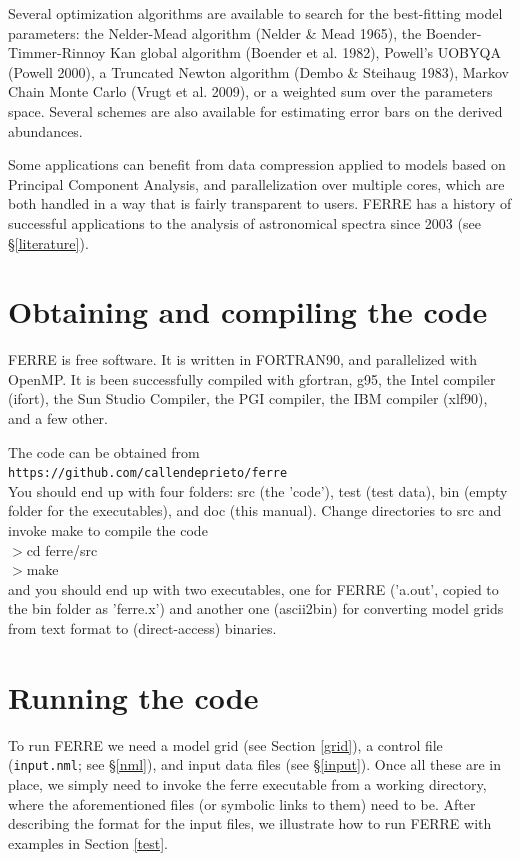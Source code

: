 \documentclass[12pt]{article}
\begin{document}
Several optimization algorithms are available to search for the 
best-fitting model parameters: 
the Nelder-Mead algorithm (Nelder \& Mead 1965), 
the  Boender-Timmer-Rinnoy Kan global algorithm (Boender et al. 1982), 
Powell's UOBYQA (Powell 2000), 
a Truncated Newton algorithm (Dembo \& Steihaug 1983), Markov Chain Monte Carlo (Vrugt et al. 2009),  
or a weighted sum over the parameters space. Several schemes are also available 
for estimating error bars on the derived abundances. 

Some applications can benefit from data compression applied to models based on 
Principal Component Analysis, and parallelization
over multiple cores, which are both handled in a way that is
fairly transparent to users.
FERRE has a history of successful applications to the analysis of
astronomical spectra since 2003 (see \S \ref{literature}).

\section{Obtaining and compiling the code}
\label{compiling}

FERRE is free software. It is written in FORTRAN90, and parallelized
with OpenMP. It is been successfully compiled with gfortran, g95, 
the Intel compiler (ifort), the  Sun Studio Compiler, the PGI compiler, 
the IBM compiler (xlf90), and a few other.

The code can be obtained from \\
{\tt https://github.com/callendeprieto/ferre} \\ 

You should end up with four
folders: src (the 'code'), test (test data), bin (empty folder for the executables), 
and doc (this manual). Change directories to src and invoke
make to compile the code  \\
$>$cd  ferre/src \\
$>$make  \\
\noindent and you should end up with two executables, 
one for FERRE ('a.out', copied to the bin folder as 'ferre.x') and 
another one (ascii2bin) for  converting model grids from text
format to (direct-access) binaries.

\section{Running the code}
\label{running}

To run FERRE we need a model grid (see Section \ref{grid}), a control
file ({\tt input.nml}; see \S \ref{nml}), 
and input data files (see \S \ref{input}).
Once all these are in place, we simply need to invoke the ferre executable
from a working directory, where the aforementioned files 
(or symbolic links to them) need to be. After describing the format 
for the input files, we illustrate how to run FERRE with examples
in Section \ref{test}.
\end{document}
